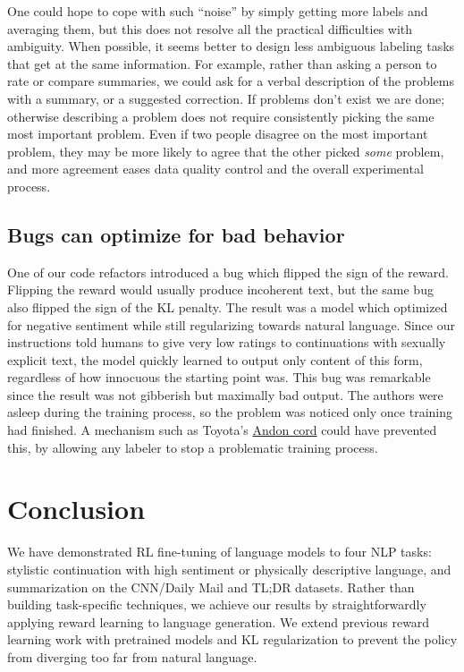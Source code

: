 \documentclass{article}
\begin{document}
One could hope to cope with such ``noise'' by simply getting more labels and averaging them,
but this does not resolve all the practical difficulties with ambiguity.
When possible, it seems better to design less ambiguous labeling tasks that get at the same information.
For example, rather than asking a person to rate or compare summaries, we could ask for a verbal description of the problems with a summary, or a suggested correction.  If problems don't exist we are done; otherwise describing a problem does not require consistently picking the same most important problem.  Even if two people disagree on the most important problem, they may be more likely to agree that the other picked \emph{some} problem, and more agreement eases data quality control and the overall experimental process.

\subsection{Bugs can optimize for bad behavior}

One of our code refactors introduced a bug which flipped the sign of the reward.  Flipping the reward would usually produce incoherent text,
but the same bug also flipped the sign of the KL penalty. 
The result was a model which optimized for negative sentiment while still regularizing towards natural language.
Since our instructions told humans to give very low ratings to continuations with sexually explicit text,
the model quickly learned to output only content of this form,
regardless of how innocuous the starting point was.  This bug was remarkable since the result was not gibberish but maximally bad output.
The authors were asleep during the training process, so the problem was noticed only once training had finished.
A mechanism such as Toyota's \href{https://en.wikipedia.org/wiki/Andon_(manufacturing)}{Andon cord} could have prevented this, by allowing any labeler to stop a problematic training process.

\section{Conclusion}

We have demonstrated RL fine-tuning of language models to four NLP tasks: stylistic continuation with high sentiment or physically descriptive language, and summarization on the CNN/Daily Mail and TL;DR datasets.  Rather than building task-specific techniques, we achieve our results by straightforwardly applying reward learning to language generation.  We extend previous reward learning work with pretrained models and KL regularization to prevent the policy from diverging too far from natural language.
\end{document}
